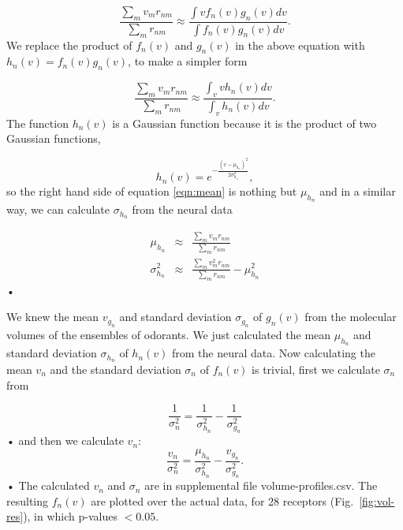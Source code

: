 \documentclass[landscape,a1paper,fontscale=0.6]{baposter} %
\newcommand{\numberofreceptors}{ 28 }
\begin{document}
\begin{poster}
{\begin{equation}
	\frac{\displaystyle \sum_{m} v_m r_{nm}}{\displaystyle \sum_{m} r_{nm}} \approx \frac{\displaystyle \int v f_n(v) g_n(v) dv}{\displaystyle \int f_n(v) g_n(v) dv}.
	\label{eqn:sta_int}
\end{equation}
We replace the product of $f_n(v)$ and $g_n(v)$ in the above equation with $h_n(v) = f_n(v) g_n(v)$, to make a simpler form

\begin{equation}
	\frac{\displaystyle \sum_{m} v_m r_{nm}}{\displaystyle \sum_{m} r_{nm}} \approx \frac{\displaystyle \int_v v h_n(v) dv}{ \displaystyle \int_v  h_n(v) dv }.
	\label{eqn:mean}
\end{equation}
The function $h_n(v)$ is a Gaussian function because it is the product of two Gaussian functions, 

\begin{equation}
h_n(v) = e^{-\frac{(v-\mu_{h_n})^2}{2\sigma_{h_n}^2}}, 
\end{equation}
so the right hand side of equation \ref{eqn:mean} is nothing but $\mu_{h_n}$ and 
in a similar way, we can calculate $\sigma_{h_n}$ from the neural data


\begin{eqnarray}
	\mu_{h_n} &\approx& \frac{\displaystyle \sum_{m} v_m r_{nm}}{\displaystyle \sum_{m} r_{nm}} \\
	\sigma_{h_n}^2 &\approx& \frac{\displaystyle \sum_{m} v_m^2 r_{nm}}{\displaystyle \sum_{m} r_{nm}} - \mu_{h_n}^2
	\label{eqn:final_h}
\end{eqnarray}•

We knew the mean $v_{g_n}$ and standard deviation $\sigma_{g_n}$ of $g_n(v)$ from the molecular volumes of the ensembles of odorants. 
We just calculated the mean $\mu_{h_n}$ and standard deviation $\sigma_{h_n}$ of $h_n(v)$ from the neural data.
Now calculating the mean $v_n$ and the standard deviation $\sigma_n$ of $f_n(v)$ is trivial,
first we calculate $\sigma_n$ from 

\begin{equation}
	\frac{1}{\sigma_n^2} = \frac{1}{\sigma^2_{h_n}}  - \frac{1}{\sigma^2_{g_n}}
\end{equation}•
and then we calculate $v_n$: 
\begin{equation}
	\frac{v_n}{\sigma_n^2}  =    \frac{\mu_{h_n}}{\sigma^2_{h_n}} - \frac{v_{g_n}}{\sigma^2_{g_n}}.
\end{equation}•
The calculated $v_n$ and $\sigma_n$ are in supplemental file volume-profiles.csv. 
The resulting $f_n(v)$ are plotted over the actual data, for \numberofreceptors receptors (Fig.~\ref{fig:vol-res}),
in which p-values $<0.05$. 

}
\end{poster}
\end{document}
